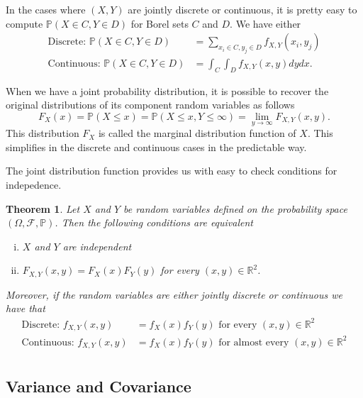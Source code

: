 \documentclass[12pt]{article}
\newcommand{\bbR}{\mathbb{R}}
\newcommand{\calF}{\mathcal{F}}
\newcommand{\Prob}{\mathbb{P}}
\newtheorem{thm}{Theorem}[section]
\theoremstyle{definition}
\theoremstyle{remark}
\numberwithin{equation}{section}
\begin{document}
  In the cases where $(X,Y)$ are jointly discrete or continuous, it is pretty easy to compute $\Prob(X\in C, Y\in D)$ for Borel sets $C$ and $D$. We have either
  \begin{align}
    \text{Discrete: } \Prob(X\in C, Y\in D) &= \sum_{x_i \in C, y_j \in D} f_{X,Y}(x_i, y_j)\\
    \text{Continuous: } \Prob(X\in C, Y\in D) &= \int_C \int_D f_{X,Y}(x,y)dydx.
  \end{align}

  When we have a joint probability distribution, it is possible to recover the original distributions of its component random variables as follows
  \begin{equation}
    F_X(x) = \Prob(X\leq x) = \Prob(X \leq x, Y \leq \infty) = \lim\limits_{y\to\infty} F_{X,Y}(x,y).
  \end{equation}
  This distribution $F_X$ is called the marginal distribution function of $X$. This simplifies in the discrete and continuous cases in the predictable way.

  The joint distribution function provides us with easy to check conditions for indepedence. 

  \begin{thm}
    Let $X$ and $Y$ be random variables defined on the probability space $(\Omega, \calF, \Prob)$. Then the following conditions are equivalent
    \begin{enumerate}[(i)]
      \item $X$ and $Y$ are independent
      \item $F_{X,Y}(x,y) = F_X(x)F_Y(y)$ for every $(x,y)\in\bbR^2$.
    \end{enumerate}
  Moreover, if the random variables are either jointly discrete or continuous we have that
  \begin{align}
    \text{Discrete: } f_{X,Y}(x, y) &= f_X(x)f_Y(y) \text{ for every } (x,y)\in\bbR^2\\
    \text{Continuous: } f_{X,Y}(x, y) &= f_X(x)f_Y(y) \text{ for almost every } (x,y)\in\bbR^2\\
  \end{align}
  \end{thm}
 \subsection{Variance and Covariance}%
 \label{sub:variance_and_covariance}
\end{document}
